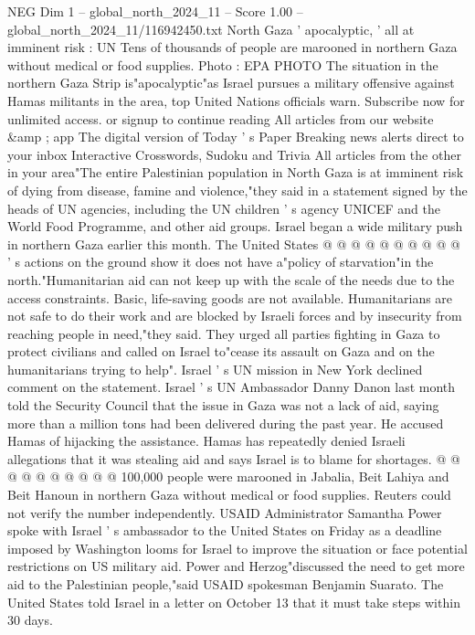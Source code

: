 \begin{textsample}{NEG Dim 1 – global\_north\_2024\_11 – Score 1.00 – global\_north\_2024\_11/116942450.txt}  \label{ex:f1_neg_217}
North Gaza ' apocalyptic, ' all at imminent risk : UN Tens of thousands of people are marooned in northern Gaza without medical or food supplies.
Photo : EPA PHOTO The situation in the northern Gaza Strip is"apocalyptic"as Israel pursues a military offensive against Hamas militants in the area, top United Nations officials warn.
Subscribe now for unlimited access. or signup to continue reading All articles from our website \&amp ; app The digital version of Today ' s Paper Breaking news alerts direct to your inbox Interactive Crosswords, Sudoku and Trivia All articles from the other in your area"The entire Palestinian population in North Gaza is at imminent risk of dying from disease, famine and violence,"they said in a statement signed by the heads of UN agencies, including the UN children ' s agency UNICEF and the World Food Programme, and other aid groups.
Israel began a wide military push in northern Gaza earlier this month.
The United States @ @ @ @ @ @ @ @ @ @ ' s actions on the ground show it does not have a"policy of starvation"in the north."Humanitarian aid can not keep up with the scale of the needs due to the access constraints.
Basic, life-saving goods are not available.
Humanitarians are not safe to do their work and are blocked by Israeli forces and by insecurity from reaching people in need,"they said.
They urged all parties fighting in Gaza to protect civilians and called on Israel to"cease its assault on Gaza and on the humanitarians trying to help".
Israel ' s UN mission in New York declined comment on the statement.
Israel ' s UN Ambassador Danny Danon last month told the Security Council that the issue in Gaza was not a lack of aid, saying more than a million tons had been delivered during the past year.
He accused Hamas of hijacking the assistance.
Hamas has repeatedly denied Israeli allegations that it was stealing aid and says Israel is to blame for shortages. @ @ @ @ @ @ @ @ @ @ 100,000 people were marooned in Jabalia, Beit Lahiya and Beit Hanoun in northern Gaza without medical or food supplies.
Reuters could not verify the number independently.
USAID Administrator Samantha Power spoke with Israel ' s ambassador to the United States on Friday as a deadline imposed by Washington looms for Israel to improve the situation or face potential restrictions on US military aid.
Power and Herzog"discussed the need to get more aid to the Palestinian people,"said USAID spokesman Benjamin Suarato.
The United States told Israel in a letter on October 13 that it must take steps within 30 days.

\end{textsample}
